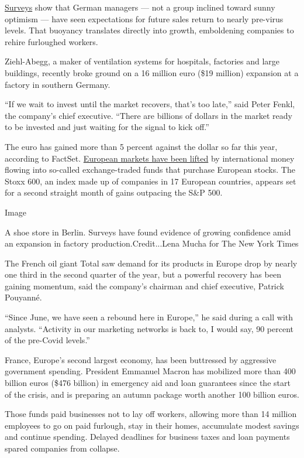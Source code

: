 \href{https://www.nytimes.com/2020/07/27/business/the-german-economy-shows-signs-of-rebounding.html}{Surveys}
show that German managers --- not a group inclined toward sunny optimism
--- have seen expectations for future sales return to nearly pre-virus
levels. That buoyancy translates directly into growth, emboldening
companies to rehire furloughed workers.

Ziehl-Abegg, a maker of ventilation systems for hospitals, factories and
large buildings, recently broke ground on a 16 million euro (\$19
million) expansion at a factory in southern Germany.

``If we wait to invest until the market recovers, that's too late,''
said Peter Fenkl, the company's chief executive. ``There are billions of
dollars in the market ready to be invested and just waiting for the
signal to kick off.''

The euro has gained more than 5 percent against the dollar so far this
year, according to FactSet.
\href{https://www.nytimes.com/2020/07/30/business/europes-markets-are-having-a-moment.html}{European
markets have been lifted} by international money flowing into so-called
exchange-traded funds that purchase European stocks. The Stoxx 600, an
index made up of companies in 17 European countries, appears set for a
second straight month of gains outpacing the S\&P 500.

Image

A shoe store in Berlin. Surveys have found evidence of growing
confidence amid an expansion in factory production.Credit...Lena Mucha
for The New York Times

The French oil giant Total saw demand for its products in Europe drop by
nearly one third in the second quarter of the year, but a powerful
recovery has been gaining momentum, said the company's chairman and
chief executive, Patrick Pouyanné.

``Since June, we have seen a rebound here in Europe,'' he said during a
call with analysts. ``Activity in our marketing networks is back to, I
would say, 90 percent of the pre-Covid levels.''

France, Europe's second largest economy, has been buttressed by
aggressive government spending. President Emmanuel Macron has mobilized
more than 400 billion euros (\$476 billion) in emergency aid and loan
guarantees since the start of the crisis, and is preparing an autumn
package worth another 100 billion euros.

Those funds paid businesses not to lay off workers, allowing more than
14 million employees to go on paid furlough, stay in their homes,
accumulate modest savings and continue spending. Delayed deadlines for
business taxes and loan payments spared companies from collapse.

